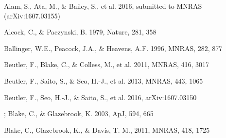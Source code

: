\documentclass[iop]{emulateapj}
\begin{document}
\begin{thebibliography}{}


Alam, S., Ata, M., \& Bailey, S., et al. 2016,
submitted to MNRAS (arXiv:1607.03155)


Alcock, C., \& Paczynski, B. 1979, Nature, 281, 358  


  

Ballinger, W.E., Peacock, J.A., \& Heavens, A.F. 1996, MNRAS, 282, 877  



Beutler, F., Blake, C., \& Colless, M., et al. 2011, MNRAS, 416, 3017

Beutler, F., Saito, S., \& Seo, H.-J., et al. 2013, MNRAS, 443, 1065

Beutler, F., Seo, H.-J., \& Saito, S., et al. 2016,
arXiv:1607.03150



;
 Blake, C., \& Glazebrook, K. 2003, ApJ, 594, 665


Blake, C., Glazebrook, K., \& Davis, T. M., 2011, MNRAS, 418, 1725  



\end{thebibliography}
\end{document}
